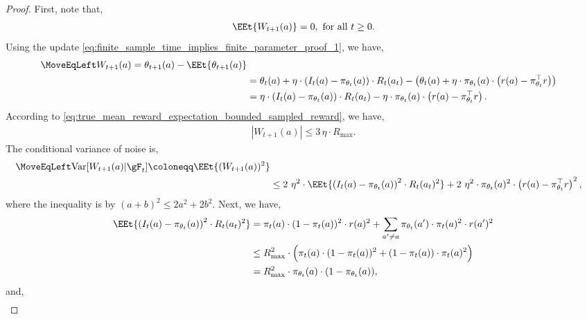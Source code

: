 \begin{proof}
First, note that,
\begin{align}
\label{eq:parameter_noise_concentration_proof_1}
    \EEt{W_{t+1}(a)}=0, \text{ for all } t \ge 0.
\end{align}
Using the update \cref{eq:finite_sample_time_implies_finite_parameter_proof_1}, we have,
\begin{align}
\label{eq:parameter_noise_concentration_proof_2}
\MoveEqLeft
    W_{t+1}(a) = \theta_{t+1}(a) - \EEt{\theta_{t+1}(a)} \\
    &=  \theta_{t}(a) + \eta \cdot \left( I_t(a) - \pi_{\theta_t}(a) \right) \cdot R_t(a_t)   - \left( \theta_{t}(a) + \eta \cdot \pi_{\theta_t}(a) \cdot \left( r(a) - \pi_{\theta_t}^\top r \right) \right) \\
    &= \eta \cdot \left( I_t(a) - \pi_{\theta_t}(a) \right) \cdot R_t(a_t)   - \eta \cdot \pi_{\theta_t}(a) \cdot \left( r(a) - \pi_{\theta_t}^\top r \right).
\end{align}
According to 
\cref{eq:true_mean_reward_expectation_bounded_sampled_reward}, we have,
\begin{align}
\label{eq:parameter_noise_concentration_proof_3}
    |W_{t+1}(a)| \le 3 \, \eta \cdot R_{\max}.
\end{align}
The conditional variance of noise is,
\begin{align}
\label{eq:parameter_noise_concentration_proof_4}
\MoveEqLeft
    \mathrm{Var}[ W_{t+1}(a) | \gF_t ] \coloneqq \EEt{( W_{t+1}(a) )^2 }  \\
    &\le 2 \ \eta^2 \cdot \EEt { \left( I_t(a) - \pi_{\theta_t}(a) \right)^2 \cdot R_t(a_t)^2 } + 2 \ \eta^2 \cdot \pi_{\theta_t}(a)^2 \cdot \left( r(a) - \pi_{\theta_t}^\top r \right)^2,
\end{align}
where the inequality is by $(a+b)^2 \le 2a^2 + 2 b^2$. Next, we have,
\begin{align}
\label{eq:parameter_noise_concentration_proof_5}
    \EEt{ \left( I_t(a) - \pi_{\theta_t}(a) \right)^2 \cdot R_t(a_t)^2 } &= \pi_t(a) \cdot ( 1 - \pi_t(a) )^2 \cdot r(a)^2 + \sum_{a'\ne a} \pi_{\theta_t}(a^\prime) \cdot \pi_t(a)^2 \cdot r(a^\prime)^2 \\
    &\le R_{\max}^2 \cdot \Big( \pi_t(a) \cdot ( 1 - \pi_t(a) )^2 + ( 1 - \pi_t(a) ) \cdot \pi_t(a)^2  \Big) \\
    &= R_{\max}^2 \cdot  \pi_{\theta_t}(a) \cdot ( 1 - \pi_{\theta_t}(a) ),
\end{align}
and,
\begin{align}
\label{eq:parameter_noise_concentration_proof_6}

\end{align}
\end{proof}
